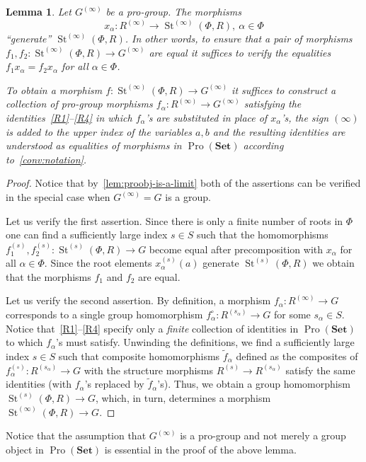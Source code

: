 \documentclass{article}
\numberwithin{equation}{section}
\newtheorem{lemma}{Lemma} \numberwithin{lemma}{section}
\theoremstyle{definition}
\theoremstyle{remark}
\DeclareMathOperator\St{St}
\DeclareMathOperator{\Pro}{Pro}
\newcommand{\Set}{\mathbf{Set}}
\begin{document}
\begin{lemma}\label{SteinbergPresentation}
Let \(G^{(\infty)}\) be a pro-group. The morphisms \[x_{\alpha} \colon R^{(\infty)} \to \St^{(\infty)}(\Phi, R), \ \alpha\in \Phi\] ``generate'' $\St^{(\infty)}(\Phi, R)$. In other words, to ensure that a pair of morphisms $f_1,f_2\colon\St^{(\infty)}(\Phi, R) \to G^{(\infty)}$ are equal it suffices to verify the equalities $f_1 x_{\alpha} = f_2 x_\alpha$ for all $\alpha\in\Phi$.

To obtain a morphism $f \colon \St^{(\infty)}(\Phi, R) \to G^{(\infty)}$ it suffices to construct a collection of pro-group morphisms \(f_{\alpha} \colon R^{(\infty)} \to G^{(\infty)}\) satisfying the identities~\eqref{R1}--\eqref{R4} in which $f_{\alpha}$'s are substituted in place of $x_\alpha$'s, the sign $(\infty)$ is added to the upper index of the variables $a, b$ and the resulting identities are understood as equalities of morphisms in \(\Pro(\Set)\) according to~\cref{conv:notation}.
\end{lemma}
\begin{proof}
Notice that by~\cref{lem:proobj-is-a-limit} both of the assertions can be verified in the special case when $G^{(\infty)} = G$ is a group.

Let us verify the first assertion. Since there is only a finite number of roots in $\Phi$ one can find a sufficiently large index $s \in S$ such that the homomorphisms $f_1^{(s)}, f_2^{(s)}\colon \St^{(s)}(\Phi, R) \to G$ become equal after precomposition with $x_\alpha$ for all $\alpha \in \Phi$.
Since the root elements $x_\alpha^{(s)}(a)$ generate $\St^{(s)}(\Phi, R)$ we obtain that the morphisms $f_1$ and $f_2$ are equal.

Let us verify the second assertion. By definition, a morphism $f_\alpha \colon R^{(\infty)} \to G$ corresponds to a single group homomorphism 
 $f_\alpha^{\circ} \colon R^{(s_\alpha)} \to G$ for some $s_\alpha \in S$.
Notice that~\eqref{R1}--\eqref{R4} specify only a {\it finite} collection of identities in $\Pro(\Set)$ to which $f_\alpha$'s must satisfy.
Unwinding the definitions, we find a sufficiently large index $s \in S$ such that composite homomorphisms $\widetilde{f}_\alpha$ defined as the composites of $f_\alpha^{(\circ)}\colon R^{(s_\alpha)} \to G$ with the structure morphisms $R^{(s)} \to R^{(s_\alpha)}$ satisfy the same identities (with $f_\alpha$'s replaced by $\widetilde{f}_\alpha$'s).
Thus, we obtain a group homomorphism $\St^{(s)}(\Phi, R) \to G$, which, in turn, determines a morphism $\St^{(\infty)}(\Phi, R) \to G$.
\end{proof}
Notice that the assumption that $G^{(\infty)}$ is a pro-group and not merely a group object in $\Pro(\Set)$ is essential in the proof of the above lemma.
\end{document}
